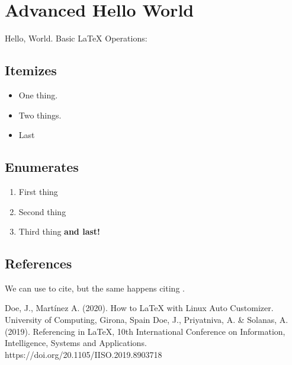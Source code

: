 \documentclass[11pt]{article}
\begin{document}
\section{Advanced Hello World}
  Hello, World. Basic LaTeX Operations:
  \subsection{Itemizes}
    \begin{itemize}
      \item One thing.
      \item Two things.
      \item Last
    \end{itemize}
  \subsection{Enumerates}
    \begin{enumerate}
      \item First thing
      \item Second thing
      \item Third thing \textbf{and last!}
    \end{enumerate}
  \subsection{References}
    We can use \cite{Doe20} to cite, but the same happens citing \cite{Doe19}.

\newpage
\begin{thebibliography}{0}
 Doe, J., Martínez A. (2020). How to LaTeX with Linux Auto Customizer. University of Computing, Girona, Spain
 Doe, J., Priyatniva, A. \& Solanas, A. (2019). Referencing in LaTeX, 10th International Conference on Information, Intelligence, Systems and Applications. https://doi.org/20.1105/IISO.2019.8903718
\end{thebibliography}
\end{document}
